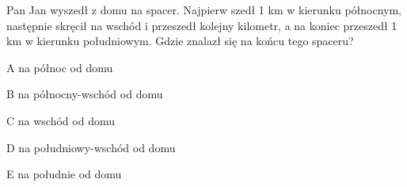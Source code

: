 \begin{tresc}
Pan Jan wyszedł z domu na spacer. Najpierw szedł 1 km w kierunku północnym, następnie skręcił na wschód i przeszedł kolejny kilometr, a na koniec przeszedł 1 km w kierunku południowym. Gdzie znalazł się na końcu tego spaceru?
\end{tresc}
\begin{wariant}{A} na północ od domu \end{wariant}
\begin{wariant}{B} na północny-wschód od domu \end{wariant}
\begin{wariant}{C} na wschód od domu \end{wariant}
\begin{wariant}{D} na południowy-wschód od domu \end{wariant}
\begin{wariant}{E} na południe od domu \end{wariant}
